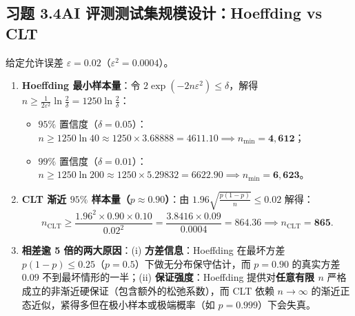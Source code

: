 \subsection*{习题 3.4\quad AI 评测测试集规模设计：Hoeffding vs CLT}
给定允许误差 $\varepsilon = 0.02$（$\varepsilon^2 = 0.0004$）。
\begin{enumerate}[label=(\arabic*), leftmargin=1.8em]
  \item \textbf{Hoeffding 最小样本量}：令 $2\exp(-2n\varepsilon^2) \le \delta$，解得 $n \ge \frac{1}{2\varepsilon^2}\ln\frac{2}{\delta} = 1250\ln\frac{2}{\delta}$：
  \begin{itemize}
    \item $95\%$ 置信度（$\delta = 0.05$）：$n \ge 1250 \ln 40 \approx 1250 \times 3.68888 = 4611.10 \implies n_{\min} = \mathbf{4{,}612}$；
    \item $99\%$ 置信度（$\delta = 0.01$）：$n \ge 1250 \ln 200 \approx 1250 \times 5.29832 = 6622.90 \implies n_{\min} = \mathbf{6{,}623}$。
  \end{itemize}
  \item \textbf{CLT 渐近 $95\%$ 样本量（$p \approx 0.90$）}：由 $1.96\sqrt{\frac{p(1-p)}{n}} \le 0.02$ 解得：
  \[
    n_{\mathrm{CLT}} \ge \frac{1.96^2 \times 0.90 \times 0.10}{0.02^2}
    = \frac{3.8416 \times 0.09}{0.0004} = 864.36 \implies n_{\mathrm{CLT}} = \mathbf{865}.
  \]
  \item \textbf{相差逾 5 倍的两大原因}：(i) \textbf{方差信息}：Hoeffding 在最坏方差 $p(1-p) \le 0.25$（$p=0.5$）下做无分布保守估计，而 $p=0.90$ 的真实方差 $0.09$ 不到最坏情形的一半；(ii) \textbf{保证强度}：Hoeffding 提供对\textbf{任意有限 $n$} 严格成立的非渐近硬保证（包含额外的松弛系数），而 CLT 依赖 $n\to\infty$ 的渐近正态近似，紧得多但在极小样本或极端概率（如 $p=0.999$）下会失真。
\end{enumerate}

